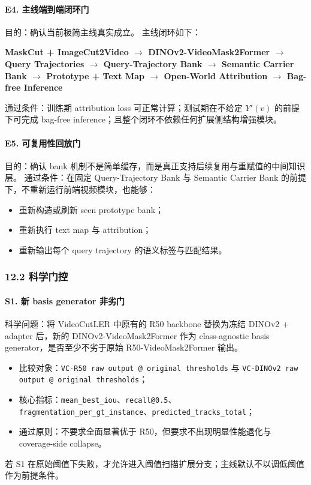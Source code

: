 \documentclass[UTF8]{ctexart}
\begin{document}
\paragraph{E4. 主线端到端闭环门}
目的：确认当前极简主线真实成立。
主线闭环如下：
\begin{center}
\textbf{MaskCut + ImageCut2Video $\rightarrow$ DINOv2-VideoMask2Former $\rightarrow$ Query Trajectories $\rightarrow$ Query-Trajectory Bank $\rightarrow$ Semantic Carrier Bank $\rightarrow$ Prototype + Text Map $\rightarrow$ Open-World Attribution $\rightarrow$ Bag-free Inference}
\end{center}
通过条件：训练期 attribution loss 可正常计算；测试期在不给定 $Y'(v)$ 的前提下可完成 bag-free inference；且整个闭环不依赖任何扩展侧结构增强模块。

\paragraph{E5. 可复用性回放门}
目的：确认 bank 机制不是简单缓存，而是真正支持后续复用与重赋值的中间知识层。
通过条件：在固定 Query-Trajectory Bank 与 Semantic Carrier Bank 的前提下，不重新运行前端视频模块，也能够：
\begin{itemize}
\item 重新构造或刷新 seen prototype bank；
\item 重新执行 text map 与 attribution；
\item 重新输出每个 query trajectory 的语义标签与匹配结果。
\end{itemize}

\subsubsection*{12.2 科学门控}

\paragraph{S1. 新 basis generator 非劣门}
科学问题：将 VideoCutLER 中原有的 R50 backbone 替换为冻结 DINOv2 + adapter 后，新的 DINOv2-VideoMask2Former 作为 class-agnostic basis generator，是否至少不劣于原始 R50-VideoMask2Former 输出。
\begin{itemize}
\item 比较对象：\texttt{VC-R50 raw output @ original thresholds} 与 \texttt{VC-DINOv2 raw output @ original thresholds}；
\item 核心指标：\texttt{mean\_best\_iou}、\texttt{recall@0.5}、\texttt{fragmentation\_per\_gt\_instance}、\texttt{predicted\_tracks\_total}；
\item 通过原则：不要求全面显著优于 R50，但要求不出现明显性能退化与 coverage-side collapse。
\end{itemize}
若 S1 在原始阈值下失败，才允许进入阈值扫描扩展分支；主线默认不以调低阈值作为前提条件。
\end{document}
